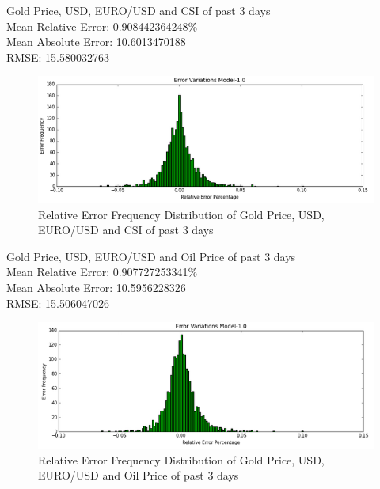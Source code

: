 \documentclass[runningheads]{llncs}
\begin{document}
\noindent Gold Price, USD, EURO/USD and CSI of past 3 days \\
Mean Relative Error: 0.908442364248\% \\
Mean Absolute Error: 10.6013470188 \\
RMSE: 15.580032763 \\
\begin{figure}
\centering
\includegraphics[width=\textwidth]{GoldUSDEuroCSI_Daily.png}
\caption{Relative Error Frequency Distribution of Gold Price, USD, EURO/USD and CSI of past 3 days}
\label{fig:GoldUSDEuroCSI_Daily.png}
\end{figure}

\noindent Gold Price, USD, EURO/USD and Oil Price of past 3 days \\
Mean Relative Error: 0.907727253341\% \\
Mean Absolute Error: 10.5956228326\\
RMSE: 15.506047026 \\
\begin{figure}
\centering
\includegraphics[width=\textwidth]{GoldUSDEuroOil_Daily.png}
\caption{Relative Error Frequency Distribution of Gold Price, USD, EURO/USD and Oil Price of past 3 days}
\label{fig:GoldUSDEuroOil_Daily.png}
\end{figure}
\end{document}
